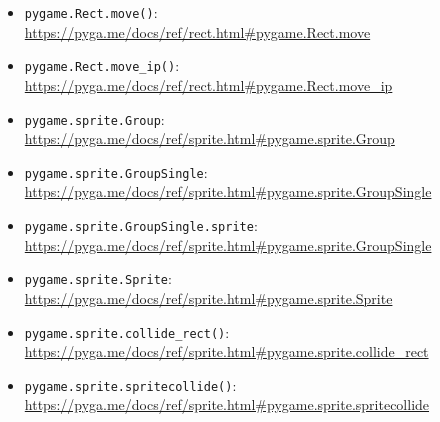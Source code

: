 \begin{itemize}
	\item \texttt{pygame.Rect.move()}:
	\\
	\url{https://pyga.me/docs/ref/rect.html#pygame.Rect.move}

	\item \texttt{pygame.Rect.move\_ip()}:
	\\
	\url{https://pyga.me/docs/ref/rect.html#pygame.Rect.move_ip}

	\item \texttt{pygame.sprite.Group}:
	\\
	\url{https://pyga.me/docs/ref/sprite.html#pygame.sprite.Group}

	\item \texttt{pygame.sprite.GroupSingle}:
	\\
	\url{https://pyga.me/docs/ref/sprite.html#pygame.sprite.GroupSingle}

	\item \texttt{pygame.sprite.GroupSingle.sprite}:
	\\
    \url{https://pyga.me/docs/ref/sprite.html#pygame.sprite.GroupSingle}

	\item \texttt{pygame.sprite.Sprite}:
	\\
	\url{https://pyga.me/docs/ref/sprite.html#pygame.sprite.Sprite}
	
	\item \texttt{pygame.sprite.collide\_rect()}:
	\\
	\url{https://pyga.me/docs/ref/sprite.html#pygame.sprite.collide_rect}
	
	\item \texttt{pygame.sprite.spritecollide()}:
    \\
    \url{https://pyga.me/docs/ref/sprite.html#pygame.sprite.spritecollide}
\end{itemize}


